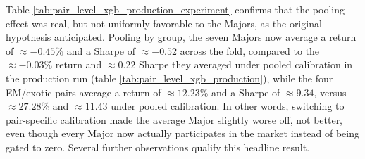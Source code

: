 \documentclass[12pt, a4paper]{article}
\begin{document}
Table \ref{tab:pair_level_xgb_production_experiment} confirms that the pooling effect was real, but not uniformly favorable to the Majors, as the original hypothesis 
anticipated. Pooling by group, the seven Majors now average a return of $\approx -0.45\%$ and a Sharpe of $\approx -0.52$ across the fold, compared to the 
$\approx -0.03\%$ return and $\approx 0.22$ Sharpe they averaged under pooled calibration in the production run (table \ref{tab:pair_level_xgb_production}), while the 
four EM/exotic pairs average a return of $\approx 12.23\%$ and a Sharpe of $\approx 9.34$, versus $\approx 27.28\%$ and $\approx 11.43$ under pooled calibration. In 
other words, switching to pair-specific calibration made the average Major slightly worse off, not better, even though every Major now actually participates 
in the market instead of being gated to zero. Several further observations qualify this headline result.
\end{document}
